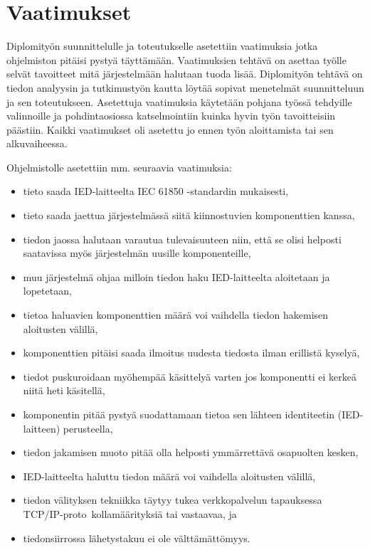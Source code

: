 \section{Vaatimukset}
\label{ch:vaatimukset}
Diplomityön suunnittelulle ja toteutukselle asetettiin vaatimuksia jotka ohjelmiston pitäisi pystyä täyttämään. Vaatimuksien tehtävä on asettaa työlle selvät tavoitteet mitä järjestelmään halutaan tuoda lisää. Diplomityön tehtävä on tiedon analyysin ja tutkimustyön kautta löytää sopivat menetelmät suunnitteluun ja sen toteutukseen. Asetettuja vaatimuksia käytetään pohjana työssä tehdyille valinnoille ja pohdintaosiossa katselmointiin kuinka hyvin työn tavoitteisiin päästiin. Kaikki vaatimukset oli asetettu jo ennen työn aloittamista tai sen alkuvaiheessa.

Ohjelmistolle asetettiin mm. seuraavia vaatimuksia:
\begin{itemize}
	\item tieto saada IED-laitteelta IEC 61850 -standardin mukaisesti,
	\item tieto saada jaettua järjestelmässä siitä kiinnostuvien komponenttien kanssa,
	\item tiedon jaossa halutaan varautua tulevaisuuteen niin, että se olisi helposti saatavissa myös järjestelmän uusille komponenteille,
	\item muu järjestelmä ohjaa milloin tiedon haku IED-laitteelta aloitetaan ja lopetetaan,
	\item tietoa haluavien komponenttien määrä voi vaihdella tiedon hakemisen aloitusten välillä,	
	\item komponenttien pitäisi saada ilmoitus uudesta tiedosta ilman erillistä kyselyä,
	\item tiedot puskuroidaan myöhempää käsittelyä varten jos komponentti ei kerkeä niitä heti käsitellä,
	\item komponentin pitää pystyä suodattamaan tietoa sen lähteen identiteetin (IED-laitteen) perusteella,
	\item tiedon jakamisen muoto pitää olla helposti ymmärrettävä osapuolten kesken,
	\item IED-laitteelta haluttu tiedon määrä voi vaihdella aloitusten välillä,
	\item tiedon välityksen tekniikka täytyy tukea verkkopalvelun tapauksessa TCP/IP-pro\-to \-kol\-la\-mää\-ri\-tyk\-si\-ä tai vastaavaa, ja
	\item tiedonsiirrossa lähetystakuu ei ole välttämättömyys.
\end{itemize}

